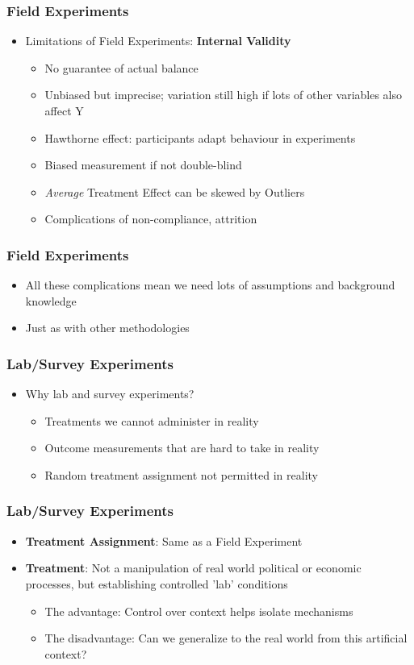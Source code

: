 \documentclass[xcolor=x11names,compress]{beamer}\usepackage[]{graphicx}\usepackage[]{xcolor}
\renewcommand{\(}{\begin{columns}}
\renewcommand{\)}{\end{columns}}
\newcommand{\<}[1]{\begin{column}{#1}}
\renewcommand{\>}{\end{column}}
\begin{document}
\begin{frame}
\frametitle{Field Experiments}
\begin{itemize}
\item Limitations of Field Experiments: \textbf{Internal Validity}
\pause
\begin{itemize}
\item No guarantee of actual balance
\item Unbiased but imprecise; variation still high if lots of other variables also affect Y
\item Hawthorne effect: participants adapt behaviour in experiments
\item Biased measurement if not double-blind
\item \textit{Average} Treatment Effect can be skewed by Outliers
\item Complications of non-compliance, attrition
\end{itemize}
\end{itemize}
\end{frame}

\begin{frame}
\frametitle{Field Experiments}
\begin{itemize}
\item All these complications mean we need lots of assumptions and background knowledge
\item Just as with other methodologies
\end{itemize}
\end{frame}

\begin{frame}
\frametitle{Lab/Survey Experiments}
\begin{itemize}
\item Why lab and survey experiments?
\pause
\begin{itemize}
\item Treatments we cannot administer in reality
\item Outcome measurements that are hard to take in reality
\item Random treatment assignment not permitted in reality
\end{itemize}
\end{itemize}
\end{frame}

\begin{frame}
\frametitle{Lab/Survey Experiments}
\begin{itemize}
\item \textbf{Treatment Assignment}: Same as a Field Experiment
\pause
\item \textbf{Treatment}: Not a manipulation of real world political or economic processes, but establishing controlled 'lab' conditions
\pause
\begin{itemize}
\item The advantage: Control over context helps isolate mechanisms
\item The disadvantage: Can we generalize to the real world from this artificial context?
\end{itemize}
\end{itemize}
\end{frame}
\end{document}
